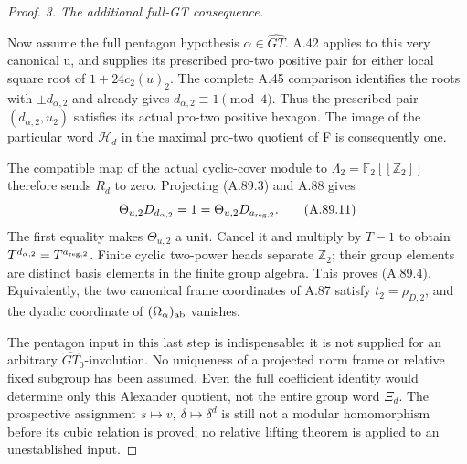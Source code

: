 \begin{proof}
\emph{3. The additional full-GT consequence.}\par
Now assume the full pentagon hypothesis
\(\alpha\in\widehat{GT}\). A.42 applies to this very canonical
u, and supplies its prescribed pro-two positive pair for either
local square root of \(1+24c_2(u)_2\). The complete A.45 comparison
identifies the roots with \(\pm d_{\alpha,2}\) and already
gives \(d_{\alpha,2}\equiv1\pmod4\). Thus the prescribed pair
\((d_{\alpha,2},u_2)\) satisfies its actual pro-two positive hexagon.
The image of the particular word \(\mathcal H_d\) in the
maximal pro-two quotient of F is consequently one.

The compatible map of the actual cyclic-cover module to
\(\Lambda_2=\mathbb F_2[[\mathbb Z_2]]\) therefore sends
\(R_d\) to zero. Projecting (A.89.3) and A.88 gives
\[
       \Theta_{u,2}D_{d_{\alpha,2}}
          =1=\Theta_{u,2}D_{a_{{\rm reg},2}}.
 \tag{A.89.11}
\]
The first equality makes \(\Theta_{u,2}\) a unit. Cancel it
and multiply by \(T-1\) to obtain
\(T^{d_{\alpha,2}}=T^{a_{{\rm reg},2}}\).
Finite cyclic two-power heads separate \(\mathbb Z_2\);
their group elements are distinct basis elements in the finite
group algebra. This proves (A.89.4). Equivalently, the two
canonical frame coordinates of A.87 satisfy
\(t_2=\rho_{D,2}\), and the dyadic coordinate of
\((\Omega_\alpha)_{\rm ab}\) vanishes.

The pentagon input in this last step is indispensable: it is
not supplied for an arbitrary \(\widehat{GT}_0\)-involution.
No uniqueness of a projected norm frame or relative fixed
subgroup has been assumed. Even the full coefficient identity
would determine only this Alexander quotient, not the entire
group word \(\Xi_d\). The prospective assignment
\(s\mapsto v,\ \delta\mapsto\delta^d\) is still not a modular
homomorphism before its cubic relation is proved; no relative
lifting theorem is applied to an unestablished input.
\end{proof}
